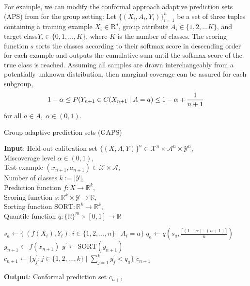 \documentclass[letterpaper]{article} %
\begin{document}
    For example, we can modify the conformal approach adaptive prediction sets (APS) from \citet{NEURIPS2020_244edd7e} for the group setting:
    Let $\{(X_i, A_i, Y_i)\}_{i=1}^n$ be a set of three tuples containing a training example $X_i \in \mathrm{R}^d$, group attribute $A_i \in \{1, 2, \ldots K\}$, and target class$Y_i \in \{0, 1, \ldots, K\}$, where $K$ is the number of classes.
    The scoring function $s$ sorts the classes according to their softmax score in descending order for each example and outputs the cumulative sum until the softmax score of the true class is reached.
    Assuming all samples are drawn interchangeably from a potentially unknown distribution, then marginal coverage can be assured for each subgroup,
    \begin{equation}
        \small
        1 - \alpha \leq P(Y_{n+1} \in C(X_{n+1} \mid A = a) \leq 1 - \alpha + \frac{1}{n + 1}
    \end{equation}
    for all $a \in A, \; \alpha \in (0, 1)$.


    \begin{algorithm}[tb]
        \small
        \caption{Group adaptive prediction sets (GAPS)}
        \label{alg:gaps}
        \textbf{Input}:
        Held-out calibration set $\{(X, A, Y)\}^n \in \mathcal{X}^n \times \mathcal{A}^n \times \mathcal{Y}^n$, \\
        Miscoverage level $\alpha \in (0, 1)$, \\
        Test example $\left(x_{n+1}, a_{n+1}\right) \in \mathcal{X} \times \mathcal{A}$, \\
        Number of classes $k := \lvert\mathcal{Y}\rvert$, \\
        Prediction function $f: X \rightarrow \mathbb{R}^k$, \\
        Scoring function $s: \mathbb{R}^k \times \mathcal{Y} \rightarrow \mathbb{R} $, \\
        Sorting function $\mathrm{SORT}: \mathbb{R}^k \rightarrow \mathbb{R}^k$, \\
        Quantile function $q: \{\mathbb{R}\}^m \times [0, 1] \rightarrow \mathbb{R}$\\
        \begin{algorithmic}[1] %
                \STATE $s_a \leftarrow \{\ \left(f(X_i), Y_i\right) : i \in \{1, 2, \ldots, n\} \mid A_i = a\}$
                \STATE $q_a \leftarrow q(s_a, \frac{\lceil (1 - \alpha) \cdot (n + 1) \rceil}{n})$
            \ENDFOR
                    \STATE $y_{n+1} \leftarrow f(x_{n+1})$
                    \STATE $y^\prime \leftarrow \mathrm{SORT}(y_{n+1})$
                    \STATE $c_{n+1} \leftarrow \{y^\prime_j : j \in \{1, 2, \ldots, k\} \mid \sum_{j=1}^k y^\prime_j < q_a \}$
                \ENDIF
            \ENDFOR
            \RETURN $c_{n+1}$
        \end{algorithmic}
        \textbf{Output}: Conformal prediction set $c_{n+1}$ \\
    \end{algorithm}
\end{document}

